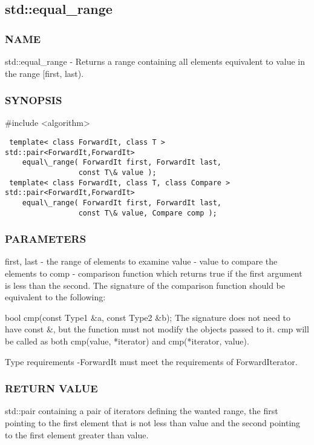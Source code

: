 \subsection{std::equal\_range}

\subsubsection{NAME}
std::equal\_range - Returns a range containing all elements equivalent to value in the range [first, last).

\subsubsection{SYNOPSIS}
\#include <algorithm>

\begin{lstlisting}
 template< class ForwardIt, class T >
std::pair<ForwardIt,ForwardIt>
    equal\_range( ForwardIt first, ForwardIt last,
                 const T\& value );
 template< class ForwardIt, class T, class Compare >
std::pair<ForwardIt,ForwardIt>
    equal\_range( ForwardIt first, ForwardIt last,
                 const T\& value, Compare comp );
\end{lstlisting}

\subsubsection{PARAMETERS}
first, last - the range of elements to examine
value - value to compare the elements to
comp - comparison function which returns true if the first argument is less than the second.
The signature of the comparison function should be equivalent to the following:

 bool cmp(const Type1 \&a, const Type2 \&b);
The signature does not need to have const \&, but the function must not modify the objects passed to it.
cmp will be called as both cmp(value, *iterator) and cmp(*iterator, value).


 Type requirements
 -ForwardIt must meet the requirements of ForwardIterator.

\subsubsection{RETURN VALUE}
std::pair containing a pair of iterators defining the wanted range, the first pointing to the first element that is not less than value and the second pointing to the first element greater than value.

